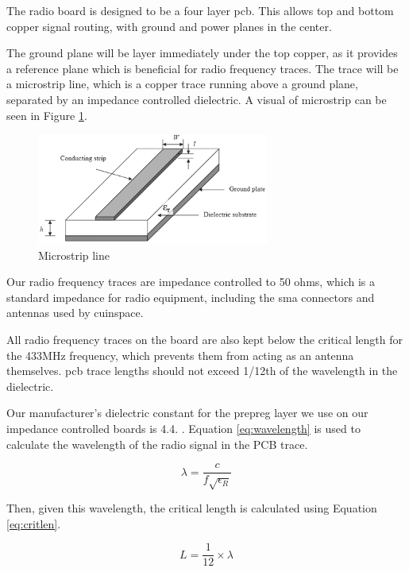 The radio board is designed to be a four layer \gls{pcb}. This allows top and bottom copper signal routing, with ground
and power planes in the center.

The ground plane will be layer immediately under the top copper, as it provides a reference plane which is beneficial
for radio frequency traces. The trace will be a microstrip line, which is a copper trace running above a ground plane,
separated by an impedance controlled dielectric. A visual of microstrip can be seen in Figure \ref{fig:microstrip}.

\begin{figure}[H]
    \centering
    \includegraphics[width=3in]{assets/images/microstrip.png}
    \caption{Microstrip line \cite{microstrip}}
    \label{fig:microstrip}
\end{figure}

Our radio frequency traces are impedance controlled to 50 ohms, which is a standard impedance for radio equipment,
including the \gls{sma} connectors and antennas used by \gls{cuinspace}.

All radio frequency traces on the board are also kept below the critical length for the 433MHz frequency, which
prevents them from acting as an antenna themselves. \Gls{pcb} trace lengths should not exceed 1/12th of the wavelength
in the dielectric. \cite{critical-length}

Our manufacturer's dielectric constant for the prepreg layer we use on our impedance controlled boards is 4.4.
\cite{jlc-pcb-impedance}. Equation \ref{eq:wavelength} is used to calculate the wavelength of the radio signal in the
PCB trace.

\begin{equation}
    \lambda = \frac{c}{f\sqrt{\epsilon_R}}
\end{equation} \label{eq:wavelength}

Then, given this wavelength, the critical length is calculated using Equation \ref{eq:critlen}.

\begin{equation}
    L = \frac{1}{12} \times \lambda
\end{equation} \label{eq:critlen}

